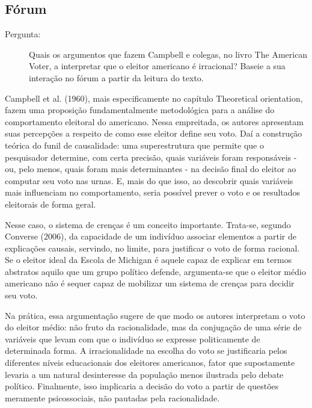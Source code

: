 \subsection{Fórum}

\begin{description}
    \item [Pergunta:] Quais os argumentos que fazem Campbell e colegas, no livro The American Voter, a interpretar que o eleitor americano é irracional? Baseie a sua interação no fórum a partir da leitura do texto. 
\end{description}

Campbell et al. (1960), mais especificamente no capítulo Theoretical orientation, fazem uma proposição fundamentalmente metodológica para a análise do comportamento eleitoral do americano. Nessa empreitada, os autores apresentam suas percepções a respeito de como esse eleitor define seu voto. Daí a construção teórica do funil de causalidade: uma superestrutura que permite que o pesquisador determine, com certa precisão, quais variáveis foram responsáveis - ou, pelo menos, quais foram mais determinantes - na decisão final do eleitor ao computar seu voto nas urnas. E, mais do que isso, ao descobrir quais variáveis mais influenciam no comportamento, seria possível prever o voto e os resultados eleitorais de forma geral.  

Nesse caso, o sistema de crenças é um conceito importante. Trata-se, segundo Converse (2006), da capacidade de um indivíduo associar elementos a partir de explicações causais, servindo, no limite, para justificar o voto de forma racional. Se o eleitor ideal da Escola de Michigan é aquele capaz de explicar em termos abstratos aquilo que um grupo político defende, argumenta-se que o eleitor médio americano não é sequer capaz de mobilizar um sistema de crenças para decidir seu voto. 

Na prática, essa argumentação sugere de que modo os autores interpretam o voto do eleitor médio: não fruto da racionalidade, mas da conjugação de uma série de variáveis que levam com que o indivíduo se expresse politicamente de determinada forma. A irracionalidade na escolha do voto se justificaria pelos diferentes níveis educacionais dos eleitores americanos, fator que supostamente levaria a um natural desinteresse da população menos ilustrada pelo debate político. Finalmente, isso implicaria a decisão do voto a partir de questões meramente psicossociais, não pautadas pela racionalidade.

